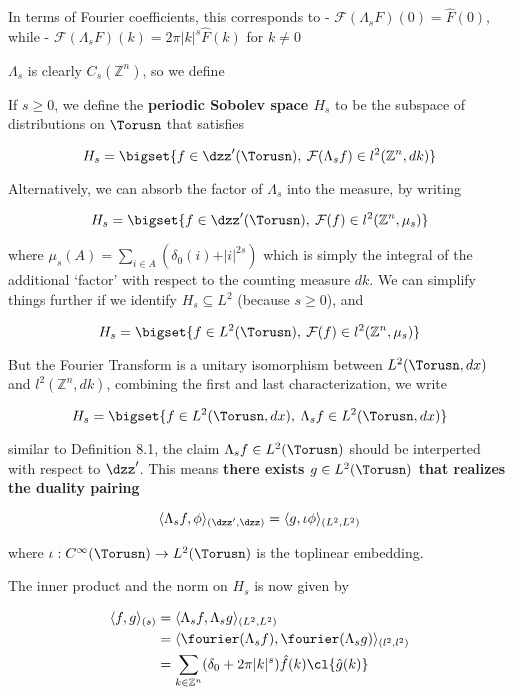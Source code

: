 In terms of Fourier coefficients, this corresponds to -
\(\mathcal{F}(\Lambda_s F)(0) = \hat{F}(0)\), while -
\(\mathcal{F}(\Lambda_s F)(k) = 2\pi\vert k\vert^{s}\hat{F}(k)\) for
\(k\neq 0\)

\(\Lambda_s\) is clearly \(C_s(\mathbb{Z}^n)\), so we define

If \(s\geq 0\), we define the \textbf{periodic Sobolev space \(H_s\)} to
be the subspace of distributions on \(\Torusn\) that satisfies

\[
H_s = \bigset{f\in \dzz'(\Torusn),\: \mathcal{F}(\Lambda_s f)\in l^2(\mathbb{Z}^n,dk)}
\]

Alternatively, we can absorb the factor of \(\Lambda_s\) into the
measure, by writing

\[
H_s = \bigset{f\in\dzz'(\Torusn),\: \mathcal{F}(f)\in l^2(\mathbb{Z}^n,\mu_s)}
\]

where \(\mu_s(A) = \sum_{i\in A}(\delta_0(i) + \vert i\vert^{2s})\)
which is simply the integral of the additional `factor' with respect to
the counting measure \(dk\). We can simplify things further if we
identify \(H_s\subseteq L^2\) (because \(s\geq 0\)), and

\[
H_s = \bigset{f\in L^2(\Torusn),\: \mathcal{F}(f)\in l^2(\mathbb{Z}^n, \mu_s)}
\]

But the Fourier Transform is a unitary isomorphism between
\(L^2(\Torusn,dx)\) and \(l^2(\mathbb{Z}^n,dk)\), combining the first
and last characterization, we write

\[
H_s = \bigset{f\in L^2(\Torusn,dx),\: \Lambda_sf\in L^2(\Torusn,dx)}
\]

similar to Definition 8.1, the claim \(\Lambda_s f\in L^2(\Torusn)\)
should be interperted with respect to \(\dzz'\). This means
\textbf{there exists \(g\in L^2(\Torusn)\) that realizes the duality
pairing}

\[
\langle \Lambda_s f,\phi\rangle_{(\dzz',\dzz)}=\langle g,\iota\phi\rangle_{(L^2,L^2)}
\]

where \(\iota:C^\infty(\Torusn)\to L^2(\Torusn)\) is the toplinear
embedding.

The inner product and the norm on \(H_s\) is now given by

\[
\begin{align}
\langle f,g\rangle_{(s)} &= \langle \Lambda_s f,\Lambda_s g\rangle_{(L^2,L^2)} \\
&=\langle \fourier(\Lambda_s f),\fourier(\Lambda_s g)\rangle_{(l^2,l^2)}\\
&= \sum_{k\in\mathbb{Z}^n}(\delta_0 + 2\pi \vert k\vert^s)\hat{f}(k)\cl{\hat{g}(k)}\\
\end{align}
\]

